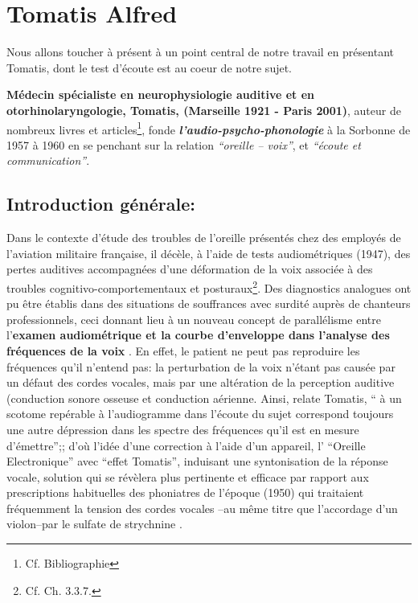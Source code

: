 \chapter{Tomatis Alfred}
Nous allons toucher à présent à un point central de notre travail en présentant
Tomatis, dont le test d'écoute est au coeur de notre sujet.


\textbf{Médecin spécialiste en neurophysiologie auditive et en
oto\-rhino\-la\-ryn\-go\-lo\-gie, Tomatis, (Marseille 1921 - Paris 2001)}, auteur de nombreux  livres et 
articles\footnote{Cf. Bibliographie}, fonde
\textit{\textbf{l'audio-psycho-phonologie}} à la Sorbonne de
1957 à 1960 en  se penchant sur la relation
\textit{``oreille -- voix''}, et \textit{``écoute
et communication''}.
\section {Introduction générale:}
Dans le contexte d'étude des troubles de
l'oreille présentés chez des employés de l'aviation militaire
française, il décèle, à l'aide
de tests audiométriques
 (1947), des pertes auditives accompagnées d'une
déformation de la voix associée à des troubles
cognitivo-comportementaux et posturaux\footnote{Cf. Ch. 3.3.7.}.
Des diagnostics analogues ont pu être établis dans des situations
de souffrances avec surdité auprès de chanteurs professionnels,
ceci donnant lieu
à un nouveau concept de
parallélisme entre l'\textbf{examen audiométrique et la courbe
d'enveloppe dans l'analyse des fréquences de la voix} \autocite {tomatisoreilletvie}.
En effet, le patient ne peut pas reproduire les fréquences qu'il
n'entend pas:
la perturbation de la voix n'étant pas causée par un défaut des cordes
vocales, mais par une altération de la perception auditive (conduction
sonore osseuse et conduction aérienne. Ainsi, relate Tomatis, \enquote{ à un scotome repérable à l'audiogramme dans l'écoute du sujet correspond toujours une autre dépression dans les spectre des fréquences qu'il est en mesure d'émettre};\autocite [75] {tomatisoreilletvie}; d'où
l'idée d'une correction à l'aide d'un appareil, l' ``Oreille
Electronique'' avec ``effet Tomatis'', induisant
une syntonisation de la réponse vocale, solution qui se révèlera plus pertinente et efficace par rapport aux prescriptions habituelles des phoniatres de
l'époque (1950) qui traitaient fréquemment la tension des cordes vocales --au même titre que
l'accordage d'un violon--par le sulfate de
strychnine \autocite {tomatisoreilletvie}.

